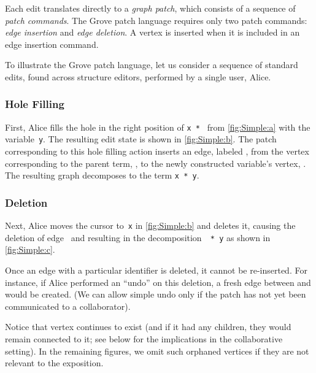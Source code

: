 Each edit translates directly to a \emph{graph patch}, which consists of a sequence of \emph{patch commands}. The Grove patch language requires only two patch commands:  \emph{edge insertion} and \emph{edge deletion}. A vertex is inserted when it is included in an edge insertion command.

To illustrate the Grove patch language, let us consider a sequence of standard edits, found across structure editors, performed by a single user, Alice.

\subsubsection{Hole Filling}%
\label{sub:Construction}

First, Alice fills the hole in the right position of \texttt{x * \hole} from \autoref{fig:Simple:a} with the variable~\texttt{y}. The resulting edit state is shown in \autoref{fig:Simple:b}.
The patch corresponding to this hole filling action inserts an edge, labeled \eSimpleY{}, from the vertex corresponding to the parent term, \vSimpleTimes{}, to the newly constructed variable's vertex, \vSimpleY{}. 
The resulting graph decomposes to the term \texttt{x * y}.

\subsubsection{Deletion}%
\label{sub:Deletion}


Next, Alice moves the cursor to~\texttt{x} in \autoref{fig:Simple:b} and deletes it, 
causing the deletion of edge~\eSimpleX{} and  resulting in the decomposition~\texttt{\hole{} * y} as shown in \autoref{fig:Simple:c}.

Once an edge with a particular identifier is deleted, it cannot be re-inserted.
For instance, if Alice performed an ``undo'' on this deletion,
a fresh edge between \vSimpleTimes{} and \vSimpleX{} would be created. (We can allow simple undo only if the patch has not yet been communicated to a collaborator). 

Notice that vertex \vSimpleX{} continues to exist (and if it had any children, they would remain connected to it; see below for the implications in the collaborative setting). In the remaining figures, we omit such orphaned vertices if they are not relevant to the exposition.


